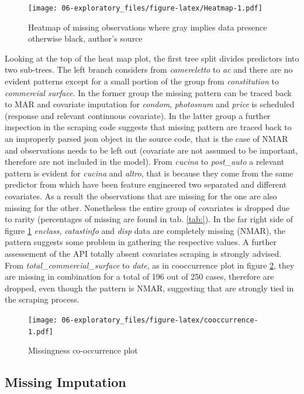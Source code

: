 \documentclass[
  12pt,
  a4paper,
  oneside]{book}
\theoremstyle{definition}
\theoremstyle{definition}
\theoremstyle{definition}
\theoremstyle{remark}
\begin{document}
\begin{figure}
\centering
\texttt{[image: 06-exploratory\_files/figure-latex/Heatmap-1.pdf]}
\caption{\label{fig:Heatmap}Heatmap of missing observations where gray implies data presence otherwise black, author's source}
\end{figure}

Looking at the top of the heat map plot, the first tree split divides predictors into two sub-trees. The left branch considers from \emph{camereletto} to \emph{ac} and there are no evident patterns except for a small portion of the group from \emph{constitution} to \emph{commercial surface}. In the former group the missing pattern can be traced back to MAR and covariate imputation for \emph{condom}, \emph{photosnum} and \emph{price} is scheduled (response and relevant continuous covariate). In the latter group a further inspection in the scraping code suggests that missing pattern are traced back to an improperly parsed json object in the source code, that is the case of NMAR and observations needs to be left out (covariate are not assumed to be important, therefore are not included in the model). From \emph{cucina} to \emph{post\_auto} a relevant pattern is evident for \emph{cucina} and \emph{altro}, that is because they come from the same predictor from which have been feature engineered two separated and different covariates. As a result the observations that are missing for the one are also missing for the other. Nonetheless the entire group of covariates is dropped due to rarity (percentages of missing are found in tab. \ref{tab:}).
In the far right side of figure \ref{fig:Heatmap} \emph{enclass}, \emph{catastinfo} and \emph{disp} data are completely missing (NMAR), the pattern suggests some problem in gathering the respective values. A further assessement of the API totally absent covariates scraping is strongly advised. From \emph{total\_commercial\_surface} to \emph{date}, as in cooccurrence plot in figure \ref{fig:cooccurrence}, they are missing in combination for a total of 196 out of 250 cases, therefore are dropped, even though the pattern is NMAR, suggesting that are strongly tied in the scraping process.

\begin{figure}
\centering
\texttt{[image: 06-exploratory\_files/figure-latex/cooccurrence-1.pdf]}
\caption{\label{fig:cooccurrence}Missingness co-occurrence plot}
\end{figure}

\hypertarget{missing-imputation}{%
\subsection{Missing Imputation}\label{missing-imputation}}
\end{document}
